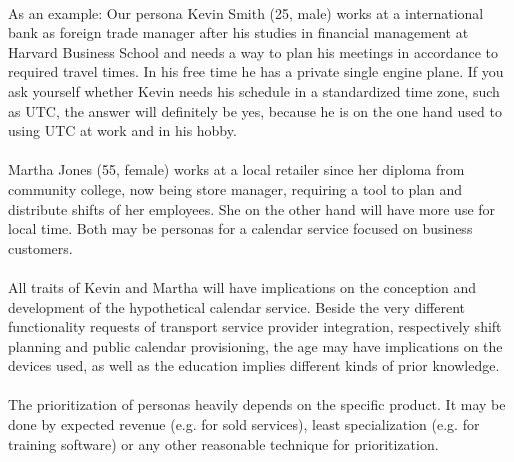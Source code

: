 \paragraph{} As an example: Our persona Kevin Smith (25, male) works at a international bank as foreign trade manager after his studies in financial management at Harvard Business School and needs a way to plan his meetings in accordance to required travel times. In his free time he has a private single engine plane. If you ask yourself whether Kevin needs his schedule in a standardized time zone, such as UTC, the answer will definitely be yes, because he is on the one hand used to using UTC at work and in his hobby. 

\paragraph{} Martha Jones (55, female) works at a local retailer since her diploma from community college, now being store manager, requiring a tool to plan and distribute shifts of her employees. She on the other hand will have more use for local time. Both may be personas for a calendar service focused on business customers. 

\paragraph{} All traits of Kevin and Martha will have implications on the conception and development of the hypothetical calendar service. Beside the very different functionality requests of transport service provider integration, respectively shift planning and public calendar provisioning, the age may have implications on the devices used, as well as the education implies different kinds of prior knowledge. 

\paragraph{} The prioritization of personas heavily depends on the specific product. It may be done by expected revenue (e.g. for sold services), least specialization (e.g. for training software) or any other reasonable technique for prioritization.

